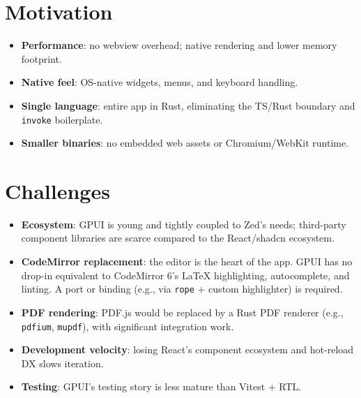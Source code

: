 \documentclass[11pt,a4paper]{report}
\begin{document}
\section{Motivation}
\begin{itemize}
  \item \textbf{Performance}: no webview overhead; native rendering and lower memory footprint.
  \item \textbf{Native feel}: OS-native widgets, menus, and keyboard handling.
  \item \textbf{Single language}: entire app in Rust, eliminating the TS/Rust boundary and \texttt{invoke} boilerplate.
  \item \textbf{Smaller binaries}: no embedded web assets or Chromium/WebKit runtime.
\end{itemize}

\section{Challenges}
\begin{itemize}
  \item \textbf{Ecosystem}: GPUI is young and tightly coupled to Zed's needs; third-party component libraries are scarce compared to the React/shadcn ecosystem.
  \item \textbf{CodeMirror replacement}: the editor is the heart of the app. GPUI has no drop-in equivalent to CodeMirror 6's LaTeX highlighting, autocomplete, and linting. A port or binding (e.g., via \texttt{rope} + custom highlighter) is required.
  \item \textbf{PDF rendering}: PDF.js would be replaced by a Rust PDF renderer (e.g., \texttt{pdfium}, \texttt{mupdf}), with significant integration work.
  \item \textbf{Development velocity}: losing React's component ecosystem and hot-reload DX slows iteration.
  \item \textbf{Testing}: GPUI's testing story is less mature than Vitest + RTL.
\end{itemize}
\end{document}
